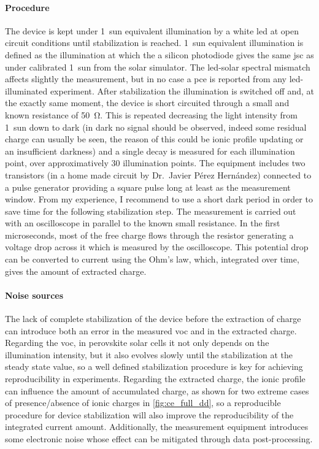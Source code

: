 \paragraph{Procedure}
The device is kept under 1~sun equivalent illumination by a white \gls{led} at open circuit conditions until stabilization is reached.
1~sun equivalent illumination is defined as the illumination at which the a silicon photodiode gives the same \gls{jsc} as under calibrated 1~sun from the solar simulator.
The \gls{led}-solar spectral mismatch affects slightly the measurement, but in no case a \gls{pce} is reported from any \gls{led}-illuminated experiment.
After stabilization the illumination is switched off and, at the exactly same moment, the device is short circuited through a small and known resistance of \SI{50}{\ohm}.
This is repeated decreasing the light intensity from 1~sun down to dark (in dark no signal should be observed, indeed some residual charge can usually be seen, the reason of this could be ionic profile updating or an insufficient darkness) and a single decay is measured for each illumination point, over approximatively 30 illumination points.
The equipment includes two transistors (in a home made circuit by Dr.\ Javier Pérez Hernández) connected to a pulse generator providing a square pulse long at least as the measurement window.
From my experience, I recommend to use a short dark period in order to save time for the following stabilization step.
The measurement is carried out with an oscilloscope in parallel to the known small resistance.
In the first microseconds, most of the free charge flows through the resistor generating a voltage drop across it which is measured by the oscilloscope.
This potential drop can be converted to current using the Ohm's law, which, integrated over time, gives the amount of extracted charge.

\paragraph{Noise sources} \label{ce_noise}
The lack of complete stabilization of the device before the extraction of charge can introduce both an error in the measured \gls{voc} and in the extracted charge.
Regarding the \gls{voc}, in perovskite solar cells it not only depends on the illumination intensity, but it also evolves slowly until the stabilization at the steady state value, so a well defined stabilization procedure is key for achieving reproducibility in  experiments.
Regarding the extracted charge, the ionic profile can influence the amount of accumulated charge, as shown for two extreme cases of presence/absence of ionic charges in \cref{fig:ce_full_dd}, so a reproducible procedure for device stabilization will also improve the reproducibility of the integrated current amount.
Additionally, the measurement equipment introduces some electronic noise whose effect can be mitigated through data post-processing.

